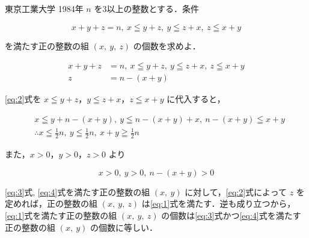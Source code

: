 \documentclass[a4paper]{ltjsarticle}
\begin{document}

\begin{itembox}[l]{東京工業大学 1984年}
    $n$ を3以上の整数とする．条件

    \begin{equation*}
        x+y+z=n,\ x\leqq y+z,\ y\leqq z+x,\ z\leqq x+y
    \end{equation*}

    を満たす正の整数の組 $(x,\ y,\ z)$ の個数を求めよ．
\end{itembox}

\begin{align}
    x+y+z & =n,\ x\leqq y+z,\ y\leqq z+x,\ z\leqq x+y\label{eq:1} \\
    z     & =n-(x+y)\label{eq:2}
\end{align}

\eqref{eq:2}式を $x\leqq y+z$，$y\leqq z+x$，$z\leqq x+y$ に代入すると，

\begin{align}
     & x\leqq y+n-(x+y),\ y\leqq n-(x+y)+x,\ n-(x+y)\leqq x+y\nonumber                          \\
     & \therefore x\leqq \frac{1}{2}n,\ y\leqq \frac{1}{2}n,\ x+y\geqq \frac{1}{2}n\label{eq:3}
\end{align}

また，$x>0$，$y>0$，$z>0$ より

\begin{equation}
    x>0,\ y>0,\ n-(x+y)>0\label{eq:4}
\end{equation}

\eqref{eq:3}式, \eqref{eq:4}式を満たす正の整数の組 $(x,\ y)$ に対して，\eqref{eq:2}式によって $z$ を定めれば，正の整数の組 $(x,\ y,\ z)$ は\eqref{eq:1}式を満たす．逆も成り立つから，\eqref{eq:1}式を満たす正の整数の組 $(x,\ y,\ z)$ の個数は\eqref{eq:3}式かつ\eqref{eq:4}式を満たす正の整数の組 $(x,\ y)$ の個数に等しい．
\end{document}
